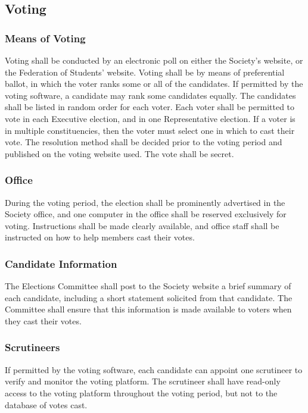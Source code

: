 \subsection{Voting}
\subsubsection{Means of Voting}
Voting shall be conducted by an electronic poll on either the Society’s website, or the Federation of Students’ website.
Voting shall be by means of preferential ballot, in which the voter ranks some or all of the candidates.
If permitted by the voting software, a candidate may rank some candidates equally.
The candidates shall be listed in random order for each voter.
Each voter shall be permitted to vote in each Executive election, and in one Representative election.
If a voter is in multiple constituencies, then the voter must select one in which to cast their vote.
The resolution method shall be decided prior to the voting period and published on the voting website used.
The vote shall be secret. 

\subsubsection{Office}
During the voting period, the election shall be prominently advertised in the Society office, and one computer in the office shall be reserved exclusively for voting.
Instructions shall be made clearly available, and office staff shall be instructed on how to help members cast their votes.

\subsubsection{Candidate Information}
The Elections Committee shall post to the Society website a brief summary of each candidate, including a short statement solicited from that candidate.
The Committee shall ensure that this information is made available to voters when they cast their votes.

\subsubsection{Scrutineers}
If permitted by the voting software, each candidate can appoint one scrutineer to verify and monitor the voting platform.
The scrutineer shall have read-only access to the voting platform throughout the voting period, but not to the database of votes cast.

